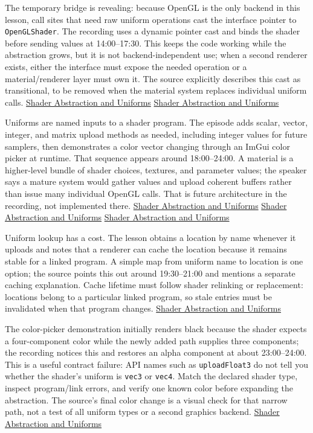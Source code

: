 The temporary bridge is revealing: because OpenGL is the only backend in this lesson, call sites that need raw uniform operations cast the interface pointer to \texttt{OpenGLShader}. The recording uses a dynamic pointer cast and binds the shader before sending values at 14:00--17:30. This keeps the code working while the abstraction grows, but it is not backend-independent use; when a second renderer exists, either the interface must expose the needed operation or a material/renderer layer must own it. The source explicitly describes this cast as transitional, to be removed when the material system replaces individual uniform calls. \href{https://www.youtube.com/watch?v=d5wL6eZnWMU&t=840s}{Shader Abstraction and Uniforms} \href{https://www.youtube.com/watch?v=d5wL6eZnWMU&t=960s}{Shader Abstraction and Uniforms}

Uniforms are named inputs to a shader program. The episode adds scalar, vector, integer, and matrix upload methods as needed, including integer values for future samplers, then demonstrates a color vector changing through an ImGui color picker at runtime. That sequence appears around 18:00--24:00. A material is a higher-level bundle of shader choices, textures, and parameter values; the speaker says a mature system would gather values and upload coherent buffers rather than issue many individual OpenGL calls. That is future architecture in the recording, not implemented there. \href{https://www.youtube.com/watch?v=d5wL6eZnWMU&t=1080s}{Shader Abstraction and Uniforms} \href{https://www.youtube.com/watch?v=d5wL6eZnWMU&t=1350s}{Shader Abstraction and Uniforms} \href{https://www.youtube.com/watch?v=d5wL6eZnWMU&t=1430s}{Shader Abstraction and Uniforms}

Uniform lookup has a cost. The lesson obtains a location by name whenever it uploads and notes that a renderer can cache the location because it remains stable for a linked program. A simple map from uniform name to location is one option; the source points this out around 19:30--21:00 and mentions a separate caching explanation. Cache lifetime must follow shader relinking or replacement: locations belong to a particular linked program, so stale entries must be invalidated when that program changes. \href{https://www.youtube.com/watch?v=d5wL6eZnWMU&t=1170s}{Shader Abstraction and Uniforms}

The color-picker demonstration initially renders black because the shader expects a four-component color while the newly added path supplies three components; the recording notices this and restores an alpha component at about 23:00--24:00. This is a useful contract failure: API names such as \texttt{uploadFloat3} do not tell you whether the shader's uniform is \texttt{vec3} or \texttt{vec4}. Match the declared shader type, inspect program/link errors, and verify one known color before expanding the abstraction. The source's final color change is a visual check for that narrow path, not a test of all uniform types or a second graphics backend. \href{https://www.youtube.com/watch?v=d5wL6eZnWMU&t=1380s}{Shader Abstraction and Uniforms}

